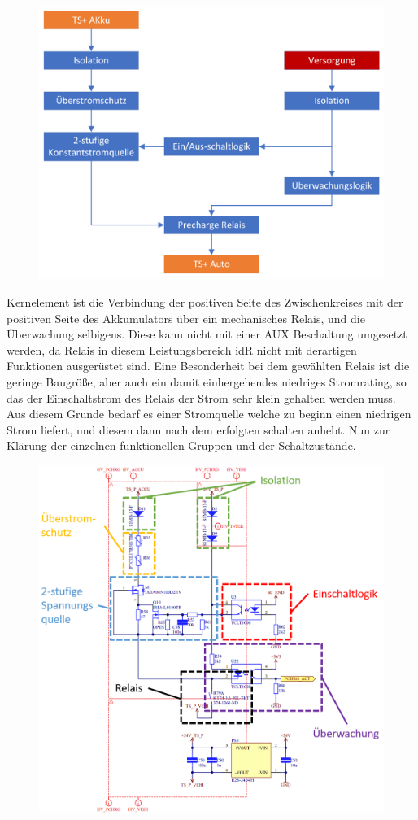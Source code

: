 \begin{figure}
	\centering
	\includegraphics[width=0.7\linewidth]{"bilder/Precharge Blockschaltbild"}
	\caption{}
	\label{fig:precharge-blockschaltbild}
\end{figure}

Kernelement ist die Verbindung der positiven Seite des Zwischenkreises mit der positiven Seite des Akkumulators über ein mechanisches Relais, und die Überwachung selbigens. Diese kann nicht mit einer AUX Beschaltung umgesetzt werden, da Relais in diesem Leistungsbereich idR nicht mit derartigen Funktionen ausgerüstet sind. Eine Besonderheit bei dem gewählten Relais ist die geringe Baugröße, aber auch ein damit einhergehendes niedriges Stromrating, so das der Einschaltstrom des Relais der Strom sehr klein gehalten werden muss. Aus diesem Grunde bedarf es einer Stromquelle welche zu beginn einen niedrigen Strom liefert, und diesem dann nach dem erfolgten schalten anhebt. Nun zur Klärung der einzelnen funktionellen Gruppen und der Schaltzustände.

\begin{figure}
	\centering
	\includegraphics[width=0.7\linewidth]{"bilder/Precharge Blockschaltbild Detail"}
	\caption{}
	\label{fig:precharge-blockschaltbild-detail}
\end{figure}

